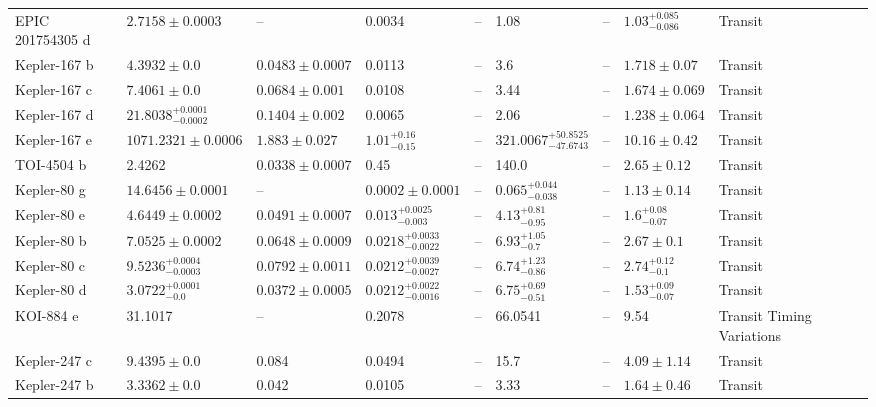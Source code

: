 \begin{tabular}{llllllllll}
EPIC 201754305 d & $2.7158 \pm 0.0003$ & -- & 0.0034 & -- & 1.08 & -- & $1.03^{+0.085}_{-0.086}$ & Transit & \cite{HELLER_ET_AL__2019} \\
Kepler-167 b & $4.3932 \pm 0.0$ & $0.0483 \pm 0.0007$ & 0.0113 & -- & 3.6 & -- & $1.718 \pm 0.07$ & Transit & \cite{CHACHAN_ET_AL__2022} \\
Kepler-167 c & $7.4061 \pm 0.0$ & $0.0684 \pm 0.001$ & 0.0108 & -- & 3.44 & -- & $1.674 \pm 0.069$ & Transit & \cite{CHACHAN_ET_AL__2022} \\
Kepler-167 d & $21.8038^{+0.0001}_{-0.0002}$ & $0.1404 \pm 0.002$ & 0.0065 & -- & 2.06 & -- & $1.238 \pm 0.064$ & Transit & \cite{CHACHAN_ET_AL__2022} \\
Kepler-167 e & $1071.2321 \pm 0.0006$ & $1.883 \pm 0.027$ & $1.01^{+0.16}_{-0.15}$ & -- & $321.0067^{+50.8525}_{-47.6743}$ & -- & $10.16 \pm 0.42$ & Transit & \cite{CHACHAN_ET_AL__2022} \\
TOI-4504 b & 2.4262 & $0.0338 \pm 0.0007$ & 0.45 & -- & 140.0 & -- & $2.65 \pm 0.12$ & Transit & \cite{ALMENARA_ET_AL_2026} \\
Kepler-80 g & $14.6456 \pm 0.0001$ & -- & $0.0002 \pm 0.0001$ & -- & $0.065^{+0.044}_{-0.038}$ & -- & $1.13 \pm 0.14$ & Transit & \cite{SHALLUE__AMP__VANDERBURG_2018} \\
Kepler-80 e & $4.6449 \pm 0.0002$ & $0.0491 \pm 0.0007$ & $0.013^{+0.0025}_{-0.003}$ & -- & $4.13^{+0.81}_{-0.95}$ & -- & $1.6^{+0.08}_{-0.07}$ & Transit & \cite{MACDONALD_ET_AL__2016} \\
Kepler-80 b & $7.0525 \pm 0.0002$ & $0.0648 \pm 0.0009$ & $0.0218^{+0.0033}_{-0.0022}$ & -- & $6.93^{+1.05}_{-0.7}$ & -- & $2.67 \pm 0.1$ & Transit & \cite{MACDONALD_ET_AL__2016} \\
Kepler-80 c & $9.5236^{+0.0004}_{-0.0003}$ & $0.0792 \pm 0.0011$ & $0.0212^{+0.0039}_{-0.0027}$ & -- & $6.74^{+1.23}_{-0.86}$ & -- & $2.74^{+0.12}_{-0.1}$ & Transit & \cite{MACDONALD_ET_AL__2016} \\
Kepler-80 d & $3.0722^{+0.0001}_{-0.0}$ & $0.0372 \pm 0.0005$ & $0.0212^{+0.0022}_{-0.0016}$ & -- & $6.75^{+0.69}_{-0.51}$ & -- & $1.53^{+0.09}_{-0.07}$ & Transit & \cite{MACDONALD_ET_AL__2016} \\
KOI-884 e & 31.1017 & -- & 0.2078 & -- & 66.0541 & -- & 9.54 & Transit Timing Variations & \cite{LAMMERS__WINN_2026} \\
Kepler-247 c & $9.4395 \pm 0.0$ & 0.084 & 0.0494 & -- & 15.7 & -- & $4.09 \pm 1.14$ & Transit & \cite{ROWE_ET_AL__2014} \\
Kepler-247 b & $3.3362 \pm 0.0$ & 0.042 & 0.0105 & -- & 3.33 & -- & $1.64 \pm 0.46$ & Transit & \cite{ROWE_ET_AL__2014} \\

\end{tabular}
